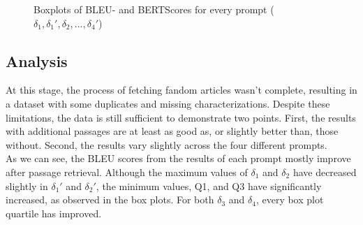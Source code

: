 \begin{figure}[H]
\begin{subfigure}[b]{\textwidth}

        \label{fig:boxplot}
    \end{subfigure}
    \vspace{1cm}
    \caption{Boxplots of BLEU- and BERTScores for every prompt ($\delta_{1}, \delta_{1}', \delta_{2},...,\delta_{4}'$)}
\end{figure}



\subsection{Analysis}

At this stage, the process of fetching fandom articles wasn't complete, resulting in a dataset with some duplicates and missing characterizations. Despite these limitations, the data is still sufficient to demonstrate two points. First, the results with additional passages are at least as good as, or slightly better than, those without. Second, the results vary slightly across the four different prompts.\\

As we can see, the BLEU scores from the results of each prompt mostly improve after passage retrieval. Although the maximum values of $\delta_{1}$ and $\delta_{2}$ have decreased slightly in $\delta_{1}'$ and $\delta_{2}'$, the minimum values, Q1, and Q3 have significantly increased, as observed in the box plots. For both $\delta_{3}$ and $\delta_{4}$, every box plot quartile has improved.\\

